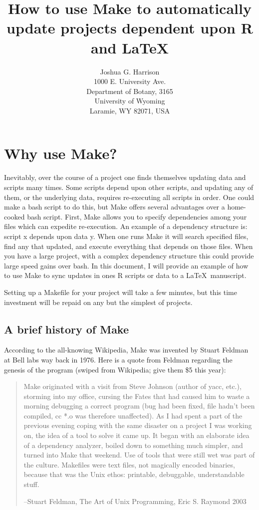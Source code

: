 \documentclass{article}
\title{How to use {\sf Make} to automatically update projects dependent upon {\sf R} and \LaTeX}
\author{
    Joshua G. Harrison\\
    1000 E. University Ave.\\
    Department of Botany, 3165\\
    University of Wyoming\\
    Laramie, WY 82071, USA\\
}
\begin{document}
\maketitle

\section{Why use {\sf Make}?}

Inevitably, over the course of a project one finds themselves updating data and scripts many times. Some scripts depend upon other scripts, and updating any of them, or the underlying data, requires re-executing all scripts in order. One could make a {\sf bash} script to do this, but {\sf Make} offers several advantages over a home-cooked {\sf bash} script. First, {\sf Make} allows you to specify dependencies among your files which can expedite re-execution. An example of a dependency structure is: script x depends upon data y. When one runs {\sf Make} it will search specified files, find any that updated, and execute everything that depends on those files. When you have a large project, with a complex dependency structure this could provide large speed gains over {\sf bash}.  
In this document, I will provide an example of how to use {\sf Make} to sync updates in ones R scripts or data to a \LaTeX\ manuscript. 

Setting up a Makefile for your project will take a few minutes, but this time investment will be repaid on any but the simplest of projects.

\subsection{A brief history of {\sf Make} }

According to the all-knowing Wikipedia, {\sf Make} was invented by Stuart Feldman at Bell labs way back in 1976. Here is a quote from Feldman regarding the genesis of the program (swiped from Wikipedia; give them \$5 this year):

    \begin{quote}
        Make originated with a visit from Steve Johnson (author of yacc, etc.), storming into my office, cursing the Fates that had caused him to waste a morning debugging a correct program (bug had been fixed, file hadn't been compiled, cc *.o was therefore unaffected). As I had spent a part of the previous evening coping with the same disaster on a project I was working on, the idea of a tool to solve it came up. It began with an elaborate idea of a dependency analyzer, boiled down to something much simpler, and turned into Make that weekend. Use of tools that were still wet was part of the culture. Makefiles were text files, not magically encoded binaries, because that was the Unix ethos: printable, debuggable, understandable stuff.
        
        --Stuart Feldman, The Art of Unix Programming, Eric S. Raymond 2003
    \end{quote}
\end{document}
